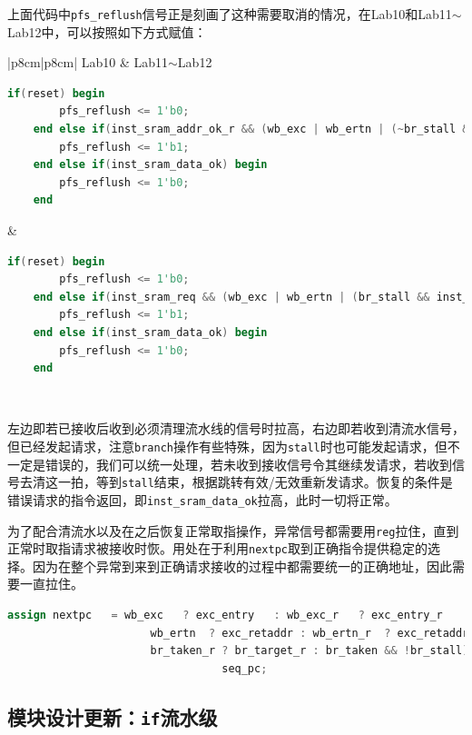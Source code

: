 \documentclass[UTF-8,twoside,c5size]{ctexart}
\begin{document}
	上面代码中\texttt{pfs_reflush}信号正是刻画了这种需要取消的情况，在Lab10和Lab11$\sim$Lab12中，可以按照如下方式赋值：
	
	\begin{center}
	\noindent
	\begin{tabular}{|p{8cm}|p{8cm}|}
	\hline
	Lab10 & Lab11$\sim$Lab12 \\
	\hline
	\begin{lstlisting}[language=verilog]
	if(reset) begin
        pfs_reflush <= 1'b0;
    end else if(inst_sram_addr_ok_r && (wb_exc | wb_ertn | (~br_stall && br_taken)) begin
        pfs_reflush <= 1'b1;
    end else if(inst_sram_data_ok) begin
        pfs_reflush <= 1'b0;
    end
	\end{lstlisting} &
	\begin{lstlisting}[language=verilog]
	if(reset) begin
        pfs_reflush <= 1'b0;
    end else if(inst_sram_req && (wb_exc | wb_ertn | (br_stall && inst_sram_addr_ok))) begin
        pfs_reflush <= 1'b1;
    end else if(inst_sram_data_ok) begin
        pfs_reflush <= 1'b0;
    end
	\end{lstlisting}\\
	\hline
	\end{tabular}
	\end{center}
	
	左边即若已接收后收到必须清理流水线的信号时拉高，右边即若收到清流水信号，但已经发起请求，注意\texttt{branch}操作有些特殊，因为\texttt{stall}时也可能发起请求，但不一定是错误的，我们可以统一处理，若未收到接收信号令其继续发请求，若收到信号去清这一拍，等到\texttt{stall}结束，根据跳转有效/无效重新发请求。恢复的条件是错误请求的指令返回，即\texttt{inst_sram_data_ok}拉高，此时一切将正常。
	
	为了配合清流水以及在之后恢复正常取指操作，异常信号都需要用\texttt{reg}拉住，直到正常时取指请求被接收时恢。用处在于利用\texttt{nextpc}取到正确指令提供稳定的选择。因为在整个异常到来到正确请求接收的过程中都需要统一的正确地址，因此需要一直拉住。
	
	\begin{lstlisting}[language=verilog]
    assign nextpc   = wb_exc   ? exc_entry   : wb_exc_r   ? exc_entry_r   :
                      wb_ertn  ? exc_retaddr : wb_ertn_r  ? exc_retaddr_r :
                      br_taken_r ? br_target_r : br_taken && !br_stall) ? br_target   :
                                 seq_pc;
	\end{lstlisting}
	
	\subsection{模块设计更新：\texttt{if}流水级}
	
\end{document}
